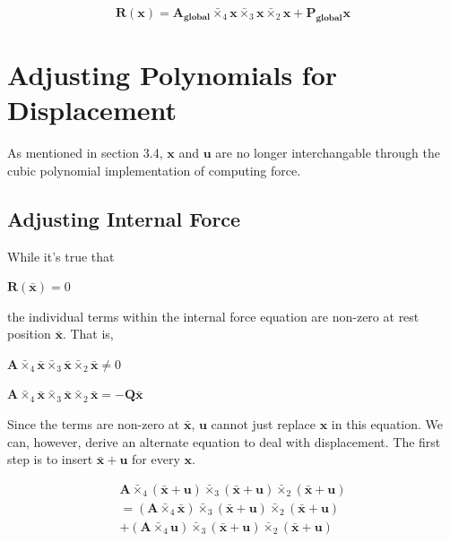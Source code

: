 \documentclass[twocolumn,10pt]{asme2ej}
\begin{document}
\begin{equation}
  \bm{R}(\bm{x}) = \bm{A_{global}} \bar{\times}_4 \bm{x} \bar{\times}_3 \bm{x} \bar{\times}_2 \bm{x} + \bm{P_{global}}\bm{x}
\end{equation}

\section{Adjusting Polynomials for Displacement}

As mentioned in section 3.4, $\bm{x}$ and $\bm{u}$ are no longer interchangable through the cubic polynomial implementation of computing force.

\subsection{Adjusting Internal Force}

While it's true that

\begin{center}
$\bm{R}(\bm{\bar{x}}) = 0$
\end{center}

the individual terms within the internal force equation are non-zero at rest position $\bm{\bar{x}}$. That is,

\begin{center}
$\bm{A} \bar{\times}_4 \bm{\bar{x}} \bar{\times}_3 \bm{\bar{x}} \bar{\times}_2 \bm{\bar{x}} \neq 0$

$\bm{A} \bar{\times}_4 \bm{\bar{x}} \bar{\times}_3 \bm{\bar{x}} \bar{\times}_2 \bm{\bar{x}} = -\bm{Q} \bm{\bar{x}}$
\end{center}

Since the terms are non-zero at $\bm{\bar{x}}$, $\bm{u}$ cannot just replace $\bm{x}$ in this equation. We can, however, derive an alternate equation to deal with displacement. The first step is to insert $\bm{\bar{x}} + \bm{u}$ for every $\bm{x}$.

\begin{multline}
\bm{A} \bar{\times}_4 (\bm{\bar{x}} + \bm{u}) \bar{\times}_3 (\bm{\bar{x}} + \bm{u}) \bar{\times}_2 (\bm{\bar{x}}+ \bm{u})
\\ = (\bm{A} \bar{\times}_4 \bm{\bar{x}}) \bar{\times}_3 (\bm{\bar{x}} + \bm{u}) \bar{\times}_2 (\bm{\bar{x}}+ \bm{u})
\\ + (\bm{A} \bar{\times}_4 \bm{u}) \bar{\times}_3 (\bm{\bar{x}} + \bm{u}) \bar{\times}_2 (\bm{\bar{x}}+ \bm{u})
\label{eq_deconstruct}
\end{multline}
\end{document}
